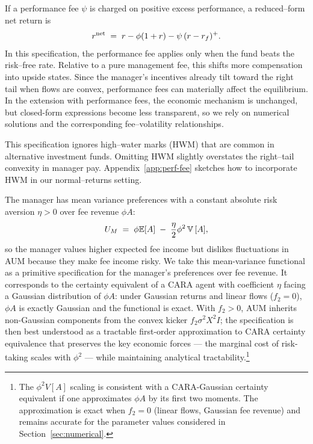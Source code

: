 If a performance fee \(\psi\) is charged on positive excess performance, a reduced--form net return is
\[
r^{\text{net}} \;=\; r - \phi(1+r) - \psi\,(r-r_f)^+.
\]
In this specification, the performance fee applies only when the fund beats the risk--free rate. Relative to a pure management fee, this shifts more compensation into upside states. Since the manager's incentives already tilt toward the right tail when flows are convex, performance fees can materially affect the equilibrium. In the extension with performance fees, the economic mechanism is unchanged, but closed-form expressions become less transparent, so we rely on numerical solutions and the corresponding fee--volatility relationships.

This specification ignores high--water marks (HWM) that are common in alternative investment funds. Omitting HWM slightly overstates the right--tail convexity in manager pay. Appendix~\ref{app:perf-fee} sketches how to incorporate HWM in our normal--returns setting.

The manager has mean variance preferences with a constant absolute risk aversion $\eta>0$ over fee revenue \(\phi A\):
\begin{equation}
    U_M \;=\; \phi\mathbb{E}[ A] \;-\; \frac{\eta}{2}\phi^2\,{\mathbb{V}}\,[A],
\end{equation}
so the manager values higher expected fee income but dislikes fluctuations in AUM because they make fee income risky. We take this mean-variance functional as a primitive specification for the manager's preferences over fee revenue. It corresponds to the certainty equivalent of a CARA agent with coefficient $\eta$ facing a Gaussian distribution of $\phi A$: under Gaussian returns and linear flows ($f_2=0$), $\phi A$ is exactly Gaussian and the functional is exact. With $f_2>0$, AUM inherits non-Gaussian components from the convex kicker $f_2\sigma^2 X^2 I$; the specification is then best understood as a tractable first-order approximation to CARA certainty equivalence that preserves the key economic forces --- the marginal cost of risk-taking scales with $\phi^2$ --- while maintaining analytical tractability.\footnote{The $\phi^2 V[A]$ scaling is consistent with a CARA-Gaussian certainty equivalent if one approximates $\phi A$ by its first two moments. The approximation is exact when $f_2=0$ (linear flows, Gaussian fee revenue) and remains accurate for the parameter values considered in Section~\ref{sec:numerical}.}

